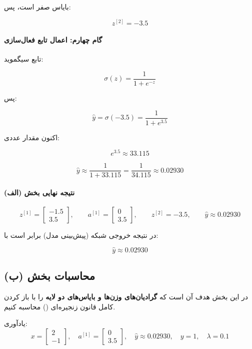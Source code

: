 \documentclass{article}
\begin{document}
بایاس صفر است، پس:

\[
z^{[2]} = -3.5
\]

\paragraph{گام چهارم: اعمال تابع فعال‌سازی }

تابع سیگموید:

\[
\sigma(z)=\frac{1}{1+e^{-z}}
\]

پس:

\[
\hat{y} = \sigma(-3.5)
= \frac{1}{1+e^{3.5}}
\]

اکنون مقدار عددی:

\[
e^{3.5} \approx 33.115
\]

\[
\hat{y} \approx \frac{1}{1+33.115}
= \frac{1}{34.115}
\approx 0.02930
\]

\paragraph{نتیجه نهایی بخش (الف)}

\[
z^{[1]}=
\begin{bmatrix}
	-1.5 \\ 3.5
\end{bmatrix},
\qquad
a^{[1]}=
\begin{bmatrix}
	0 \\ 3.5
\end{bmatrix},
\qquad
z^{[2]}=-3.5,
\qquad
\hat{y}\approx 0.02930
\]

در نتیجه خروجی شبکه (پیش‌بینی مدل) برابر است با:

\[
\boxed{\hat{y} \approx 0.02930}
\]




\subsection{محاسبات بخش (ب)}

در این بخش هدف آن است که \textbf{گرادیان‌های وزن‌ها و بایاس‌های دو لایه} را با باز کردن کامل قانون زنجیره‌ای () محاسبه کنیم.

یادآوری:
\[
x=\begin{bmatrix} 2 \\ -1\end{bmatrix},
\quad
a^{[1]}=\begin{bmatrix} 0 \\ 3.5\end{bmatrix},
\quad
\hat{y}\approx 0.02930,
\quad
y=1,
\quad
\lambda=0.1
\]
\end{document}

